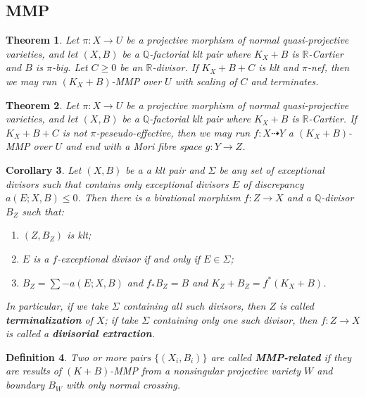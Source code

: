 \documentclass{article}
\newtheorem{defn}{Definition}[subsection]
\newtheorem{thm}[defn]{Theorem}
\newtheorem{cor}[defn]{Corollary}
\newtheorem{rmk}[defn]{Remark}
\begin{document}
\subsection{MMP}
\begin{thm}
\cite[Corollary 1.4.2]{birkarExistenceMinimalModels2009}Let $ \pi:X\to U $ be a projective morphism of normal quasi-projective varieties, and let $(X,B)$ be a $\mathbb{Q}$-factorial klt pair where $K_{X}+B$ is $\mathbb{R}$-Cartier and $B$ is $\pi$-big. Let $C\geqslant0$ be an $\mathbb{R}$-divisor. If $K_{X}+B+C$ is klt and  $\pi$-nef, then we may run $(K_{X}+B)$-MMP over $U$  with scaling of $C$ and  terminates.
\end{thm}
\begin{thm}\label{notpseudoeffmfs}
  \cite[Corollary 1.3.3]{birkarExistenceMinimalModels2009}Let $ \pi:X\to U $ be a projective morphism of normal quasi-projective varieties, and let $(X,B)$ be a $\mathbb{Q}$-factorial klt pair where $K_{X}+B$ is $\mathbb{R}$-Cartier.  If $K_{X}+B+C$ is  not $\pi$-peseudo-effective, then we may run $f:X\dashrightarrow Y$ a $(K_{X}+B)$-MMP over   $U$ and end with a Mori fibre space $g:Y\to Z$.
\end{thm}

\begin{cor}\label{extraction}
Let $ (X,B) $ be a a klt pair and $\Sigma$ be any set of exceptional divisors such that  contains only exceptional divisors $ E $ of discrepancy $ a(E;X,B)\leqslant 0 $. Then there is a birational morphism $ f:Z\to X $ and a $ \mathbb{Q} $-divisor $ B_Z $ such that:
  \begin{enumerate}
    \item $ (Z,B_Z) $ is klt;
    \item $ E $ is a $f$-exceptional divisor if and only if $ E\in\Sigma $;
    \item $ B_Z=\sum-a(E;X,B) $ and $ f_*B_Z=B $ and $ K_Z+B_Z=f^*(K_X+B) $.
  \end{enumerate} 
  In particular, if we take $ \Sigma $ containing all such divisors, then $ Z $ is called \textbf{terminalization} of $ X $; if take $ \Sigma $ containing only one such divisor, then $ f:Z\to X $ is called a \textbf{divisorial extraction}.    
\end{cor}

\begin{defn}
  \cite[Definition 3.3]{brunoLogSarkisovProgram1995}
  Two or more pairs $ \{(X_i,B_i)\} $ are called \textbf{MMP-related} if they are results of $ (K+B) $-MMP from a nonsingular  projective variety $ W $ and  boundary $ B_W $ with only normal crossing.
\end{defn}
  
\end{document}
